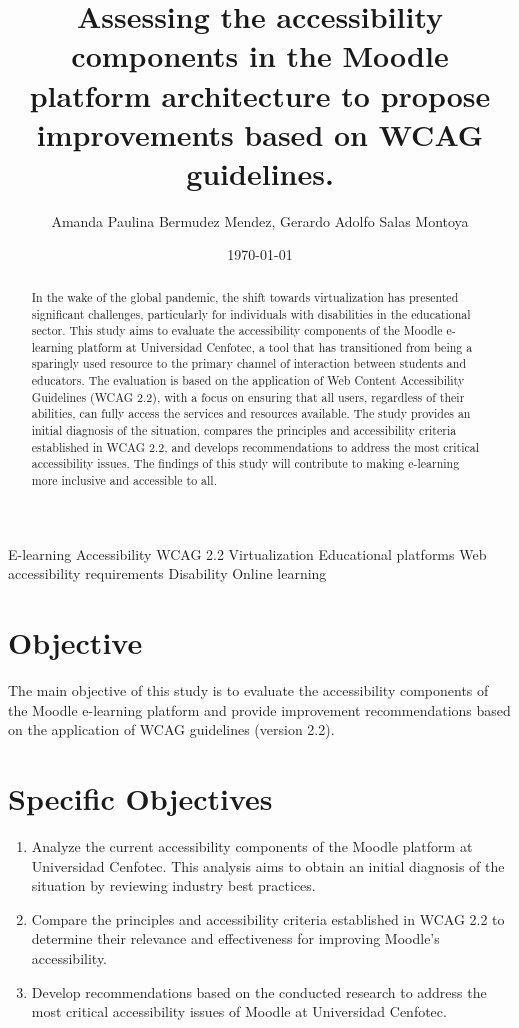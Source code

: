 \documentclass{IEEEtran}
\title{Assessing the accessibility components in the Moodle platform architecture to propose improvements based on WCAG guidelines.}
\author{Amanda Paulina Bermudez Mendez, Gerardo Adolfo Salas Montoya}
\date{\today}
\begin{document}
\maketitle

\begin{abstract}
    In the wake of the global pandemic, the shift towards virtualization has presented significant challenges, particularly for individuals with disabilities in the educational sector. This study aims to evaluate the accessibility components of the Moodle e-learning platform at Universidad Cenfotec, a tool that has transitioned from being a sparingly used resource to the primary channel of interaction between students and educators. The evaluation is based on the application of Web Content Accessibility Guidelines (WCAG 2.2), with a focus on ensuring that all users, regardless of their abilities, can fully access the services and resources available. The study provides an initial diagnosis of the situation, compares the principles and accessibility criteria established in WCAG 2.2, and develops recommendations to address the most critical accessibility issues. The findings of this study will contribute to making e-learning more inclusive and accessible to all.
\end{abstract}
    
\begin{IEEEkeywords}
    E-learning
    Accessibility
    WCAG 2.2
    Virtualization
    Educational platforms
    Web accessibility requirements
    Disability
    Online learning
\end{IEEEkeywords}

\section{Objective}
The main objective of this study is to evaluate the accessibility components of the Moodle e-learning platform and provide improvement recommendations based on the application of WCAG guidelines (version 2.2).

\section{Specific Objectives}
\begin{enumerate}
    \item Analyze the current accessibility components of the Moodle platform at Universidad Cenfotec. This analysis aims to obtain an initial diagnosis of the situation by reviewing industry best practices.
    \item Compare the principles and accessibility criteria established in WCAG 2.2 to determine their relevance and effectiveness for improving Moodle's accessibility.
    \item Develop recommendations based on the conducted research to address the most critical accessibility issues of Moodle at Universidad Cenfotec.
\end{enumerate}
\end{document}
